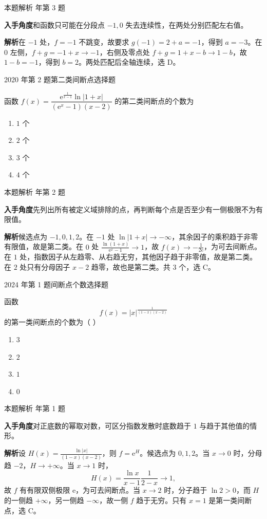 \documentclass[UTF8,zihao=-4,fontset=fandol]{ctexart}
\newenvironment{abcd}{\begin{enumerate}[label=\textup{(\Alph*)},leftmargin=2.3em,itemsep=1pt,topsep=4pt,parsep=1pt]}{\end{enumerate}}
\newcommand{\choices}[4]{%
  \begin{abcd}
    \item #1
    \item #2
    \item #3
    \item #4
  \end{abcd}}
\newcommand{\QuestionPage}[6]{%
  \par\noindent\begin{minipage}{\linewidth}
  \raggedright
  {\small\textcolor{black!60}{#3\quad #5}\hfill\textcolor{accent}{#2}}\par\smallskip}
\newcommand{\QuestionEnd}{\end{minipage}\par\medskip}
\newcommand{\QuestionPage}[6]{%
  \clearpage
  {\small\textcolor{accent}{#1\hfill #2}}\par\medskip
  {\small\textcolor{black!60}{#3\quad #5\hfill #6}}\par\vspace{9bp}}
\newcommand{\QuestionEnd}{}
\newenvironment{QuestionSolution}[1]{%
  \clearpage
  {\small\textcolor{black!60}{本题解析\quad #1}}\par\medskip
}{\par\clearpage}
\begin{document}
\begin{QuestionSolution}{2018 年第 3 题}
\textbf{入手角度}\quad 和函数只可能在分段点 \(-1,0\) 失去连续性，在两处分别匹配左右值。

\textbf{解析}\quad 在 \(-1\) 处，\(f=-1\) 不跳变，故要求 \(g(-1)=2+a=-1\)，得到 \(a=-3\)。在 \(0\) 左侧，\(f+g=-1+x\to-1\)，右侧及零点处 \(f+g=1+x-b\to1-b\)，故 \(1-b=-1\)，得到 \(b=2\)。两处匹配后全轴连续，选 D。
\end{QuestionSolution}

\QuestionPage{1.5 连续函数}{选择题}{2020 年第 2 题}{1}{第二类间断点}{046 / 234}
函数 \(f\left( x \right) = \dfrac{\mathrm{e}^{\frac{1}{x-1}} \ln \left| 1+x \right|}{\left( \mathrm{e}^{x} - 1 \right)\left( x-2 \right)}\) 的第二类间断点的个数为
\choices{\(1\) 个}{\(2\) 个}{\(3\) 个}{\(4\) 个}
\QuestionEnd

\begin{QuestionSolution}{2020 年第 2 题}
\textbf{入手角度}\quad 先列出所有被定义域排除的点，再判断每个点是否至少有一侧极限不为有限值。

\textbf{解析}\quad 候选点为 \(-1,0,1,2\)。在 \(-1\) 处 \(\ln|1+x|\to-\infty\)，其余因子的乘积趋于非零有限值，故是第二类。在 \(0\) 处 \(\frac{\ln(1+x)}{\mathrm{e}^x-1}\to1\)，故 \(f(x)\to-\frac{1}{2\mathrm{e}}\)，为可去间断点。在 \(1\) 处，指数因子从左趋零、从右趋无穷，其他因子趋于非零值，故是第二类。在 \(2\) 处只有分母因子 \(x-2\) 趋零，故也是第二类。共 \(\boxed{3}\) 个，选 C。
\end{QuestionSolution}

\QuestionPage{1.5 连续函数}{选择题}{2024 年第 1 题}{1}{间断点个数}{047 / 234}
函数
\[f(x)=|x|^{\frac{1}{(1-x)(x-2)}}
\]
的第一类间断点的个数为（ ）
\choices{\(3\)}{\(2\)}{\(1\)}{\(0\)}
\QuestionEnd

\begin{QuestionSolution}{2024 年第 1 题}
\textbf{入手角度}\quad 对正底数的幂取对数，可区分指数发散时底数趋于 \(1\) 与趋于其他值的情形。

\textbf{解析}\quad 设 \(H(x)=\frac{\ln|x|}{(1-x)(x-2)}\)，则 \(f=\mathrm{e}^H\)。候选点为 \(0,1,2\)。当 \(x\to0\) 时，分母趋 \(-2\)，\(H\to+\infty\)。当 \(x\to1\) 时，
\[
H(x)=\frac{\ln x}{x-1}\frac{1}{2-x}\longrightarrow1,
\]
故 \(f\) 有有限双侧极限 \(\mathrm{e}\)，为可去间断点。当 \(x\to2\) 时，分子趋于 \(\ln 2>0\)，而 \(H\) 的一侧趋 \(+\infty\)，另一侧趋 \(-\infty\)，故一侧 \(f\) 趋于无穷。只有 \(x=1\) 是第一类间断点，选 C。
\end{QuestionSolution}
\end{document}
